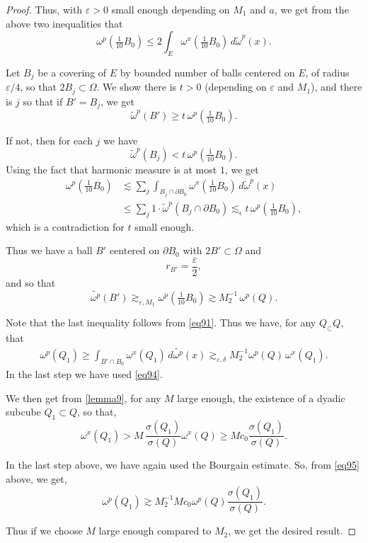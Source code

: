 \documentclass{article}
\newcounter{lem}
\theoremstyle{plain}
\theoremstyle{plain}
\newcommand{\eps}{\epsilon}
\theoremstyle{definition}
\theoremstyle{plain}
\begin{document}
\begin{proof}
Thus, with $\varepsilon > 0$ small enough depending on $M_1$ and $a$,
we get from the above two inequalities that
\begin{equation}\label{eq:2}
\omega^p\!\left(\tfrac{1}{10} B_0\right)
\le 2 \int_E \omega^x\!\left(\tfrac{1}{10} B_0\right)
\, d\widetilde{\omega}^p(x).
\end{equation}

Let $B_j$ be a covering of $E$ by bounded number of balls centered on $E$,
of radius $\varepsilon/4$, so that $2B_j \subset \Omega$.
We show there is $t > 0$ (depending on $\varepsilon$ and $M_1$), and there
is $j$ so that if $B' = B_j$, we get
\[
\widetilde{\omega}^p(B') \ge t \, \omega^p\!\left(\tfrac{1}{10} B_0\right).
\]

If not, then for each $j$ we have
\[
\widetilde{\omega}^p(B_j) < t \, \omega^p\!\left(\tfrac{1}{10} B_0\right).
\]
Using the fact that harmonic measure is at most $1$, we get
\begin{align*}
\omega^p\!\left(\tfrac{1}{10} B_0\right)
&\lesssim \sum_j \int_{B_j \cap \partial B_0}
\omega^x\!\left(\tfrac{1}{10} B_0\right) \, d\widetilde{\omega}^p(x) \\
&\le \sum_j 1 \cdot \widetilde{\omega}^p(B_j \cap \partial B_0)
\lesssim_\eps t \, \omega^p\!\left(\tfrac{1}{10} B_0\right),
\end{align*}
which is a contradiction for $t$ small enough.

Thus we have a ball $B'$ centered on $\partial B_0$ with $2B' \subset \Omega$ and
\[
r_{B'} = \frac{\varepsilon}{2},
\]
and so that
\begin{equation}\label{eq94}
\widetilde{\omega^p}(B') \gtrsim_{\varepsilon,M_1} \omega^p\!\left(\tfrac{1}{10}B_0\right)
\gtrsim M_2^{-1}\,\omega^p(Q).
\end{equation}

Note that the last inequality follows from \cref{eq91}. 
Thus we have, for any $Q_\subset Q$, that
\begin{align}\label{eq95}
\omega^p(Q_1)
\ge \int_{B'\cap B_0} \omega^x(Q_1)\,d\widetilde{\omega^p}(x)
\gtrsim_{\varepsilon,\delta} M_{2}^{-1}\omega^p(Q)\,\omega^x(Q_1).
\end{align}
In the last step we have used  \cref{eq94}.

We then get from \cref{lemma9}, for any $M$ large enough, the existence of a dyadic subcube $Q_1\subset Q$, so that,
\[
\omega^x(Q_1) 
> M\,\frac{\sigma(Q_1)}{\sigma(Q)} \omega^x(Q)\geq Mc_0 \frac{\sigma(Q_1)}{\sigma(Q)}.
\]

In the last step above, we have again used the Bourgain estimate. So, from \cref{eq95} above, we get, 
\[
\omega^p(Q_1)
\gtrsim M_{2}^{-1} Mc_0\omega^p (Q)\frac{\sigma(Q_1)}{\sigma(Q)}.
\]

Thus if we choose $M$ large enough compared to $M_2$, we get the desired result.


\end{proof}
\end{document}
